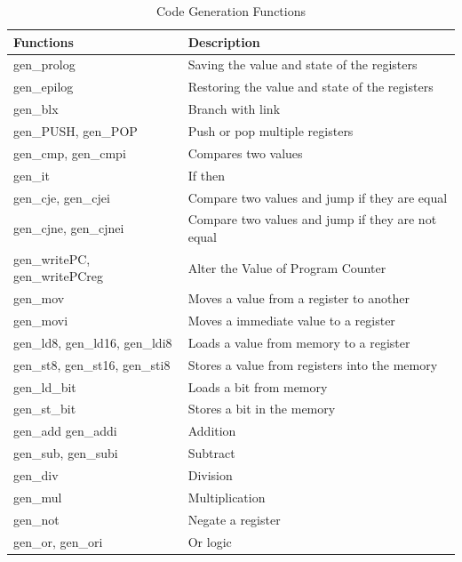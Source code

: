 \documentclass{report}
\begin{document}
	\begin{table}[h]
		\caption{Code Generation Functions}
		\label{IRTable}
		\centering
		\begin{tabular}{|l|p{10cm}|}
			\hline
			\rowcolor[HTML]{C0B0C1} 
			\textbf{Functions}	    		  &	\textbf{Description}\\ \hline
			gen\_prolog			    		  &	Saving the value and state of the registers \\ \hline 
			gen\_epilog			    		  &	Restoring the value and state of the registers \\ \hline 
			gen\_blx		    	          &	Branch with link \\ \hline 
			gen\_PUSH, gen\_POP               &	Push or pop multiple registers \\ \hline 
			gen\_cmp, gen\_cmpi 	          &	Compares two values\\ \hline 
			gen\_it					          & If then	\\ \hline 
			gen\_cje, gen\_cjei 	          & Compare two values and jump if they are equal	\\ \hline 
			gen\_cjne, gen\_cjnei		      & Compare two values and jump if they are not equal	\\ \hline 
			gen\_writePC, gen\_writePCreg     & Alter the Value of Program Counter\\ \hline 
			gen\_mov 					      & Moves a value from a register to another\\ \hline 
			gen\_movi 						  & Moves a immediate value to a register \\ \hline
			gen\_ld8, gen\_ld16, gen\_ldi8	  & Loads a value from memory to a register\\ \hline 
			gen\_st8, gen\_st16, gen\_sti8    &	Stores a value from registers into the memory\\ \hline 
			gen\_ld\_bit                      &	Loads a bit from memory\\ \hline 
			gen\_st\_bit                      &	Stores a bit in the memory\\ \hline 
			gen\_add gen\_addi				  &	Addition \\ \hline 
			gen\_sub, gen\_subi				  &	Subtract \\ \hline 
			gen\_div						  &	Division \\ \hline 
			gen\_mul					      &	Multiplication \\ \hline 
			gen\_not						  &	Negate a register\\ \hline 
			gen\_or, gen\_ori				  &	Or logic \\ \hline 

\end{tabular}
\end{table}
\end{document}
